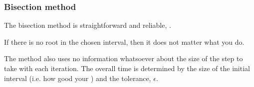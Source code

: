 \documentclass[hyperref={colorlinks=true}]{beamer}
\begin{document}
\begin{frame}%
  \frametitle{Bisection method}

  The bisection method is straightforward and reliable, .
  
  \mysp 
  
  If there is no root in the chosen interval, then it does not matter what you do.
  
  \mysp
  
  The method also uses no information whatsoever about the size of the step to take with each iteration. The overall time is determined  by the size of the initial interval (i.e. how good your ) and the tolerance, $\epsilon$.
  
  \mysp
  
  \pause
  
  \centering {}
  
\end{frame}

\end{document}
